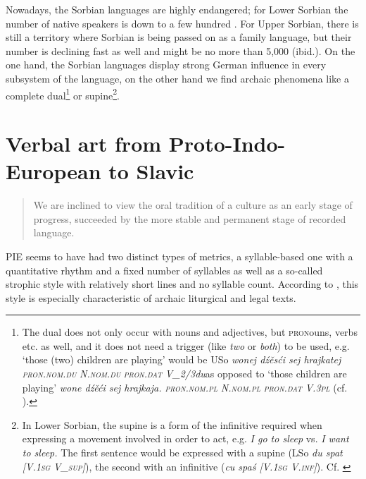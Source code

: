 \documentclass[output=paper,hidelinks]{langscibook}
\begin{document}
Nowadays, the Sorbian languages are highly endangered; for Lower Sorbian the number of native speakers is down to a few hundred \citep{Walde2004, Lewaszkiewicz2014}. For Upper Sorbian, there is still a territory where Sorbian is being passed on as a family language, but their number is declining fast as well and might be no more than 5,000 (ibid.). On the one hand, the Sorbian languages display strong German influence in every subsystem of the language, on the other hand we find archaic phenomena like a complete dual\footnote{The dual does not only occur with nouns and adjectives, but \textsc{pron}ouns, verbs etc. as well, and it does not need a trigger (like \textit{two} or \textit{both}) to be used, e.g. ‘those (two) children are playing’ would be USo \textit{wonej dźěsći sej hrajkatej \textsc{pron}.\textsc{nom}.\textsc{du}} \textit{N.\textsc{nom}.\textsc{du}} \textit{\textsc{pron}.\textsc{dat}} \textit{V\_2/3du}as opposed to ‘those children are playing’ \textit{wone dźěći sej hrajkaja. \textsc{pron}.\textsc{nom}.\textsc{pl}} \textit{N.\textsc{nom}.\textsc{pl}} \textit{\textsc{pron}.\textsc{dat}} \textit{V.\textsc{3pl}} (cf. \citealt[429ff, fn. 29]{Faßke1980}).
} or supine\footnote{In Lower Sorbian, the supine is a form of the infinitive required when expressing a movement involved in order to act, e.g. \textit{I go to sleep} vs. \textit{I want to sleep.} The first sentence would be expressed with a supine (LSo \textit{du spat [V.\textsc{1sg}} \textit{V\_\textsc{sup}]}), the second with an infinitive (\textit{cu spaś [V.\textsc{1sg} V.\textsc{inf}]}). Cf. \citet[354]{Janaš1976}}.
 

\section{Verbal art from Proto-Indo-European to Slavic}
\begin{quote}
We are inclined to view the oral tradition of a culture as an early stage of progress, succeeded by the more stable and permanent stage of recorded language. \citep[340]{Berleant1973}%
\end{quote}

 
PIE seems to have had two distinct types of metrics, a syllable-based one with a quantitative rhythm and a fixed number of syllables as well as a so-called strophic style with relatively short lines and no syllable count. According to \citet[35]{Fortson2010}, this style is especially characteristic of archaic liturgical and legal texts.
 
\end{document}

